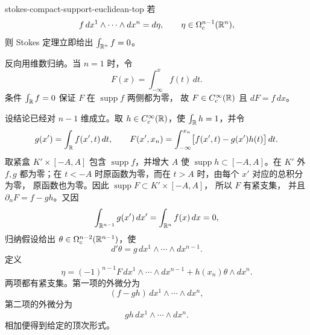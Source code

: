 \begin{solution}{stokes-compact-support-euclidean-top}
若
\[
 f\,dx^1\wedge\cdots\wedge dx^n=d\eta,
 \qquad \eta\in\Omega_c^{n-1}(\mathbb{R}^n),
\]
则 Stokes 定理立即给出 $\int_{\mathbb{R}^n}f=0$。

反向用维数归纳。当 $n=1$ 时，令
\[
 F(x)=\int_{-\infty}^xf(t)\,dt.
\]
条件 $\int_{\mathbb{R}} f=0$ 保证 $F$ 在 $\operatorname{supp}f$ 两侧都为零，
故 $F\in C_c^\infty(\mathbb{R})$ 且 $dF=f\,dx$。

设结论已经对 $n-1$ 维成立。取
$h\in C_c^\infty(\mathbb{R})$，使 $\int_{\mathbb{R}} h=1$，并令
\[
 g(x')=\int_{\mathbb{R}} f(x',t)\,dt,\qquad
 F(x',x_n)=\int_{-\infty}^{x_n}
 \bigl[f(x',t)-g(x')h(t)\bigr]\,dt.
\]
取紧盒 $K'\times[-A,A]$ 包含 $\operatorname{supp}f$，并增大 $A$ 使
$\operatorname{supp}h\subset[-A,A]$。在 $K'$ 外 $f,g$ 都为零；在
$t<-A$ 时原函数为零，而在 $t>A$ 时，由每个 $x'$ 对应的总积分为零，
原函数也为零。因此 $\operatorname{supp}F\subset K'\times[-A,A]$，
所以 $F$ 有紧支集，
并且 $\partial_nF=f-gh$。又因
\[
 \int_{\mathbb{R}^{n-1}}g(x')\,dx'=\int_{\mathbb{R}^n}f(x)\,dx=0,
\]
归纳假设给出 $\theta\in\Omega_c^{n-2}(\mathbb{R}^{n-1})$，使
\[
 d'\theta=g\,dx^1\wedge\cdots\wedge dx^{n-1}.
\]
定义
\[
 \eta=(-1)^{n-1}F\,dx^1\wedge\cdots\wedge dx^{n-1}
      +h(x_n)\theta\wedge dx^n.
\]
两项都有紧支集。第一项的外微分为
\[
 (f-gh)\,dx^1\wedge\cdots\wedge dx^n,
\]
第二项的外微分为
\[
 gh\,dx^1\wedge\cdots\wedge dx^n.
\]
相加便得到给定的顶次形式。
\end{solution}
